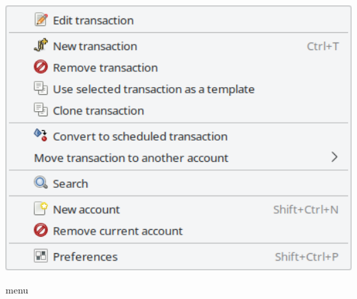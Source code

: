 \begin{minipage}{.3\linewidth}
	\vspace{-5pt}					%
	\centering						%
		\includegraphics[width=1\textwidth]{image/screenshot/home_menubar_edit}
	\vspace{-15pt}					%
	\captionsetup{
	type=figure,%
	name=Fig.,%
	labelsep=newline}			%
	\caption{ menu}	%
	\label{home_menubar_edit}
\end{minipage}

